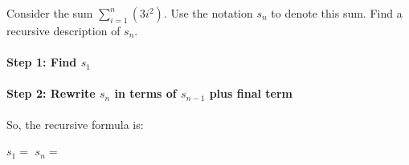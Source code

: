         \newpage
        \begin{questionNOGRADE}{\thequestion}

            Consider the sum $\sum_{i=1}^{n} (3i^{2})$. Use the notation
            $s_{n}$ to denote this sum. Find a recursive description of $s_{n}$.

            \paragraph{Step 1: Find $s_{1}$}


            \paragraph{Step 2: Rewrite $s_{n}$ in terms of $s_{n-1}$ plus final term}
            

            So, the recursive formula is:

            \begin{framed}
                $s_{1} = $ 
                \tab[4cm]
                $s_{n} = $ 
            \end{framed}
            
        \end{questionNOGRADE}

        \hrulefill

